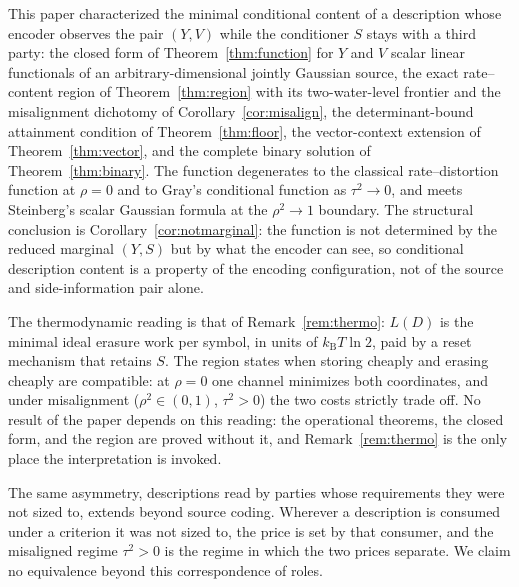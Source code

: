 ﻿\documentclass[11pt,onecolumn]{IEEEtran}
\newcommand{\kb}{k_{\mathrm{B}}}
\begin{document}
This paper characterized the minimal conditional content of a description
whose encoder observes the pair $(Y,V)$ while the conditioner $S$ stays with
a third party: the closed form of Theorem~\ref{thm:function} for $Y$ and
$V$ scalar linear functionals of an arbitrary-dimensional jointly Gaussian
source, the exact rate--content region of Theorem~\ref{thm:region} with
its two-water-level frontier and the misalignment dichotomy of
Corollary~\ref{cor:misalign}, the determinant-bound attainment condition
of Theorem~\ref{thm:floor}, the vector-context extension of
Theorem~\ref{thm:vector}, and the complete binary solution of
Theorem~\ref{thm:binary}. The function degenerates to the classical
rate--distortion function at $\rho=0$ and to Gray's conditional function as
$\tau^2\to0$, and meets Steinberg's scalar Gaussian formula at the
$\rho^2\to1$ boundary. The structural conclusion is
Corollary~\ref{cor:notmarginal}: the function is not determined by the
reduced marginal $(Y,S)$ but by what the encoder can see, so conditional
description content is a property of the encoding configuration, not of the
source and side-information pair alone.

The thermodynamic reading is that of Remark~\ref{rem:thermo}: $L(D)$ is
the minimal ideal erasure work per symbol, in units of $\kb T\ln2$, paid
by a reset mechanism that retains $S$. The region states when storing
cheaply and erasing cheaply are compatible: at $\rho=0$ one channel minimizes
both coordinates, and under misalignment ($\rho^2\in(0,1)$, $\tau^2>0$) the
two costs strictly trade off. No result of the paper depends on this
reading: the operational theorems, the closed form, and the region are
proved without it, and Remark~\ref{rem:thermo} is the only place the
interpretation is invoked.

The same asymmetry, descriptions read by parties whose requirements they
were not sized to, extends beyond source coding. Wherever a description
is consumed under a criterion it was not sized to, the price is set by
that consumer, and the misaligned regime $\tau^2>0$ is the regime in
which the two prices separate. We claim no equivalence beyond this
correspondence of roles.
\end{document}

